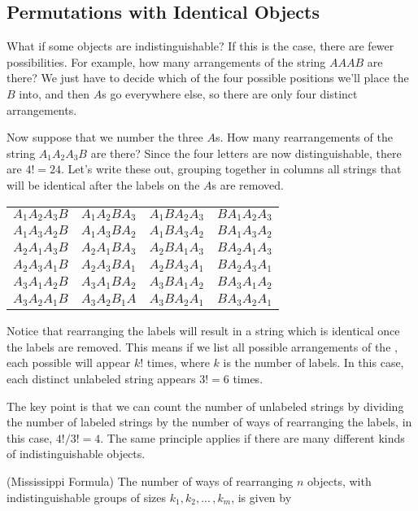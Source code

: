 \subsection*{Permutations with Identical Objects}
\par
What if some objects are indistinguishable? If this is the case, there are fewer possibilities. For example, how many arrangements of the string $AAAB$ are there? We just have to decide which of the four possible positions we'll place the $B$ into, and then $A$s go everywhere else, so there are only four distinct arrangements.

Now suppose that we number the three $A$s. How many rearrangements of the string $A_1A_2A_3B$ are there? Since the four letters are now distinguishable, there are $4! = 24$. Let's write these out, grouping together in columns all strings that will be identical after the labels on the $A$s are removed.
\begin{center}
\begin{tabular}{cccc}
$A_1A_2A_3B$ & $A_1A_2BA_3$ & $A_1BA_2A_3$ & $BA_1A_2A_3$ \\
$A_1A_3A_2B$ & $A_1A_3BA_2$ & $A_1BA_3A_2$ & $BA_1A_3A_2$ \\
$A_2A_1A_3B$ & $A_2A_1BA_3$ & $A_2BA_1A_3$ & $BA_2A_1A_3$ \\
$A_2A_3A_1B$ & $A_2A_3BA_1$ & $A_2BA_3A_1$ & $BA_2A_3A_1$ \\
$A_3A_1A_2B$ & $A_3A_1BA_2$ & $A_3BA_1A_2$ & $BA_3A_1A_2$ \\
$A_3A_2A_1B$ & $A_3A_2B_1A$ & $A_3BA_2A_1$ & $BA_3A_2A_1$ \\
\end{tabular}
\end{center}
Notice that rearranging the labels will result in a string which is identical once the labels are removed. This means if we list all possible arrangements of the , each possible  will appear $k!$ times, where $k$ is the number of labels. In this case, each distinct unlabeled string appears $3! = 6$ times.
\par
The key point is that we can count the number of unlabeled strings by dividing the number of labeled strings by the number of ways of rearranging the labels, in this case, $4! / 3! = 4$. The same principle applies if there are many different kinds of indistinguishable objects.
\par
\begin{prop} (Mississippi Formula) The number of ways of rearranging $n$ objects, with indistinguishable groups of sizes $k_1, k_2, ...\, ,k_m$, is given by
\end{prop}
